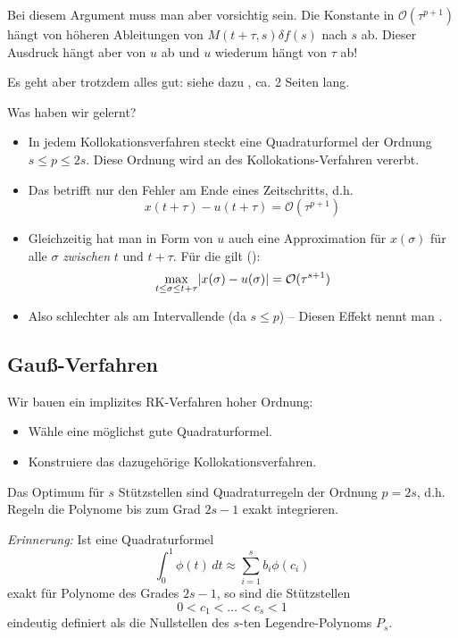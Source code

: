 Bei diesem Argument muss man aber vorsichtig sein. Die Konstante in $\mathcal{O}(\tau^{p+1})$ hängt von höheren Ableitungen von $M(t+\tau,s)\delta f(s)$ nach $s$ ab. Dieser Ausdruck hängt aber von $u$ ab und $u$ wiederum hängt von $\tau$ ab!

Es geht aber trotzdem alles gut: siehe dazu {\cite[Lemma 6.41]{deuflhard_bornemann:2008}}, ca. 2 Seiten lang.

Was haben wir gelernt?
\begin{itemize}
	\item In jedem Kollokationsverfahren steckt eine Quadraturformel der Ordnung $s\leq p\leq2s$. Diese Ordnung wird an des Kollokations-Verfahren vererbt.
	\item Das betrifft nur den Fehler am Ende eines Zeitschritts, d.h.
	\begin{equation*}
		x(t+\tau) - u(t+\tau) = \mathcal{O}(\tau^{p+1})
	\end{equation*}
	\item Gleichzeitig hat man in Form von $u$ auch eine Approximation für $x(\sigma)$ für alle $\sigma$ \emph{zwischen} $t$ und $t+\tau$. Für die gilt (\cite[Lemma~6.41]{deuflhard_bornemann:2008}):
	\begin{equation*}
		\max_{t\leq\sigma\leq t+\tau} \lvert x(\sigma)-u(\sigma) \rvert = \mathcal{O}(\tau^{s+1})
	\end{equation*}
	\item Also schlechter als am Intervallende (da $s\leq p$) -- Diesen Effekt nennt man .
\end{itemize}

\subsection{Gauß-Verfahren}

Wir bauen ein implizites RK-Verfahren hoher Ordnung:
\begin{itemize}
	\item Wähle eine möglichst gute Quadraturformel.
	\item Konstruiere das dazugehörige Kollokationsverfahren.
\end{itemize}
Das Optimum für $s$ Stützstellen sind Quadraturregeln der Ordnung $p=2s$, d.h. Regeln die Polynome bis zum Grad $2s-1$ exakt integrieren.

\emph{Erinnerung:} Ist eine Quadraturformel
\begin{equation*}
	\int_0^1 \phi(t)\,dt \approx \sum_{i=1}^s b_i\phi(c_i)
\end{equation*}
exakt für Polynome des Grades $2s-1$, so sind die Stützstellen
\begin{equation*}
	0<c_1<\hdots<c_s<1
\end{equation*}
eindeutig definiert als die Nullstellen des $s$-ten Legendre-Polynoms $P_s$.

